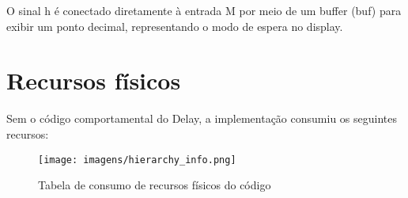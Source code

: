 O sinal h é conectado diretamente à entrada M por meio de um buffer (buf) para exibir um ponto decimal, representando o modo de espera no display.

\section{Recursos físicos}

Sem o código comportamental do Delay, a implementação consumiu os seguintes recursos:

\begin{figure}[!h]
    \centering
    \texttt{[image: imagens/hierarchy\_info.png]}
    \caption{Tabela de consumo de recursos físicos do código}
    \label{fig:hierarchy_info}
\end{figure}
